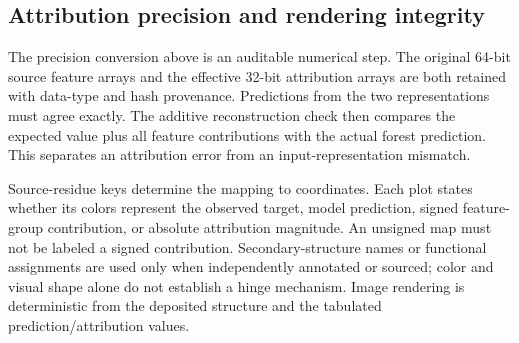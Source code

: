 \subsection{Attribution precision and rendering integrity}
\label{sec:attribution_details}
The precision conversion above is an auditable numerical step. The original 64-bit source feature arrays and the effective 32-bit attribution arrays are both retained with data-type and hash provenance. Predictions from the two representations must agree exactly. The additive reconstruction check then compares the expected value plus all feature contributions with the actual forest prediction. This separates an attribution error from an input-representation mismatch.

Source-residue keys determine the mapping to coordinates. Each plot states whether its colors represent the observed target, model prediction, signed feature-group contribution, or absolute attribution magnitude. An unsigned map must not be labeled a signed contribution. Secondary-structure names or functional assignments are used only when independently annotated or sourced; color and visual shape alone do not establish a hinge mechanism. Image rendering is deterministic from the deposited structure and the tabulated prediction/attribution values.
